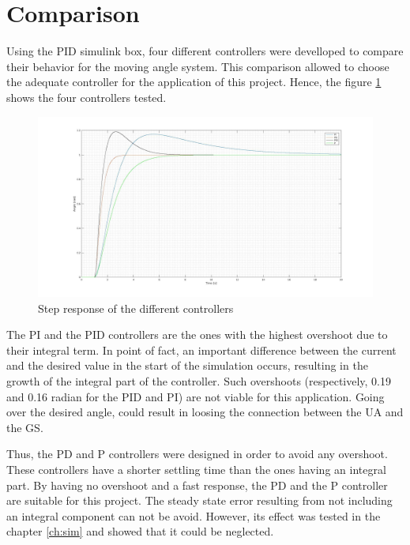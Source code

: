 \section{Comparison}
Using the PID simulink box, four different controllers were develloped to compare their behavior for the moving angle system. This comparison allowed to choose the adequate controller for the application of this project. Hence, the figure \ref{fig:comp_pid} shows the four controllers tested.

\begin{figure}[H]
\centering
\includegraphics[scale=0.2]{figures/comp_full.jpg}
\caption{Step response of the different controllers}
\label{fig:comp_pid}
\end{figure}

The PI and the PID controllers are the ones with the highest overshoot due to their integral term. In point of fact, an important difference between the current and the desired value in the start of the simulation occurs, resulting in the growth of the integral part of the controller. 
Such overshoots (respectively, 0.19 and 0.16 radian for the PID and PI) are not viable for this application. Going over the desired angle, could result in loosing the connection between the UA and the GS.

Thus, the PD and P controllers were designed in order to avoid any overshoot. These controllers have a shorter settling time than the ones having an integral part. By having no overshoot and a fast response, the PD and the P controller are suitable for this project. The steady state error resulting from not including an integral component can not be avoid. However, its effect was tested in the chapter \ref{ch:sim} and showed that it could be neglected.

\vspace{5mm}

